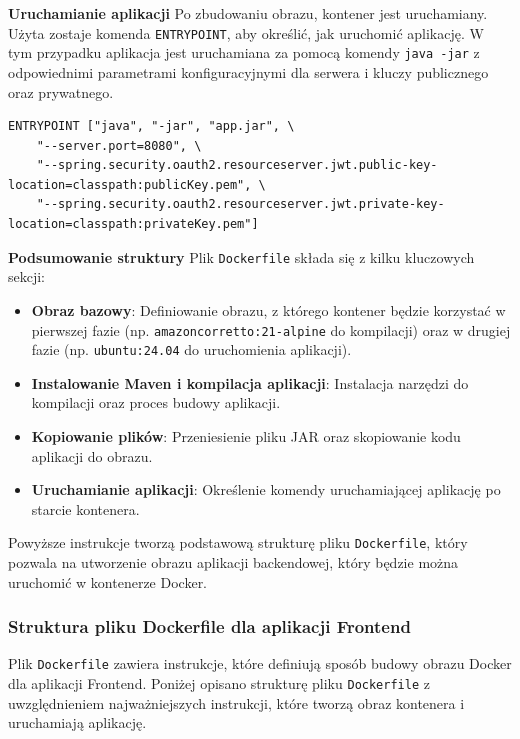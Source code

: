 \noindent \textbf{Uruchamianie aplikacji}
Po zbudowaniu obrazu, kontener jest uruchamiany. Użyta zostaje komenda \texttt{ENTRYPOINT}, aby określić, jak uruchomić aplikację. W tym przypadku aplikacja jest uruchamiana za pomocą komendy \texttt{java -jar} z odpowiednimi parametrami konfiguracyjnymi dla serwera i kluczy publicznego oraz prywatnego.
\begin{lstlisting}[basicstyle=\footnotesize\ttfamily]
ENTRYPOINT ["java", "-jar", "app.jar", \
    "--server.port=8080", \
    "--spring.security.oauth2.resourceserver.jwt.public-key-location=classpath:publicKey.pem", \
    "--spring.security.oauth2.resourceserver.jwt.private-key-location=classpath:privateKey.pem"]
\end{lstlisting}

\noindent \textbf{Podsumowanie struktury}
Plik \texttt{Dockerfile} składa się z kilku kluczowych sekcji:
\begin{itemize}
    \item \textbf{Obraz bazowy}: Definiowanie obrazu, z którego kontener będzie korzystać w pierwszej fazie (np. \texttt{amazoncorretto:21-alpine} do kompilacji) oraz w drugiej fazie (np. \texttt{ubuntu:24.04} do uruchomienia aplikacji).
    \item \textbf{Instalowanie Maven i kompilacja aplikacji}: Instalacja narzędzi do kompilacji oraz proces budowy aplikacji.
    \item \textbf{Kopiowanie plików}: Przeniesienie pliku JAR oraz skopiowanie kodu aplikacji do obrazu.
    \item \textbf{Uruchamianie aplikacji}: Określenie komendy uruchamiającej aplikację po starcie kontenera.
\end{itemize}

Powyższe instrukcje tworzą podstawową strukturę pliku \texttt{Dockerfile}, który pozwala na utworzenie obrazu aplikacji backendowej, który będzie można uruchomić w kontenerze Docker.

\subsubsection{Struktura pliku Dockerfile dla aplikacji Frontend}

Plik \texttt{Dockerfile} zawiera instrukcje, które definiują sposób budowy obrazu Docker dla aplikacji Frontend. Poniżej opisano strukturę pliku \texttt{Dockerfile} z uwzględnieniem najważniejszych instrukcji, które tworzą obraz kontenera i uruchamiają aplikację.\\[-10pt]

